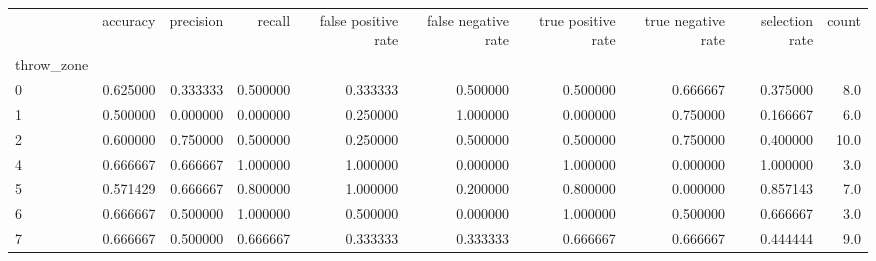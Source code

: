 \begin{tabular}{lrrrrrrrrr}
\toprule
{} &  accuracy &  precision &    recall &  false positive rate &  false negative rate &  true positive rate &  true negative rate &  selection rate &  count \\
throw\_zone &           &            &           &                      &                      &                     &                     &                 &        \\
\midrule
0          &  0.625000 &   0.333333 &  0.500000 &             0.333333 &             0.500000 &            0.500000 &            0.666667 &        0.375000 &    8.0 \\
1          &  0.500000 &   0.000000 &  0.000000 &             0.250000 &             1.000000 &            0.000000 &            0.750000 &        0.166667 &    6.0 \\
2          &  0.600000 &   0.750000 &  0.500000 &             0.250000 &             0.500000 &            0.500000 &            0.750000 &        0.400000 &   10.0 \\
4          &  0.666667 &   0.666667 &  1.000000 &             1.000000 &             0.000000 &            1.000000 &            0.000000 &        1.000000 &    3.0 \\
5          &  0.571429 &   0.666667 &  0.800000 &             1.000000 &             0.200000 &            0.800000 &            0.000000 &        0.857143 &    7.0 \\
6          &  0.666667 &   0.500000 &  1.000000 &             0.500000 &             0.000000 &            1.000000 &            0.500000 &        0.666667 &    3.0 \\
7          &  0.666667 &   0.500000 &  0.666667 &             0.333333 &             0.333333 &            0.666667 &            0.666667 &        0.444444 &    9.0 \\
\bottomrule
\end{tabular}
